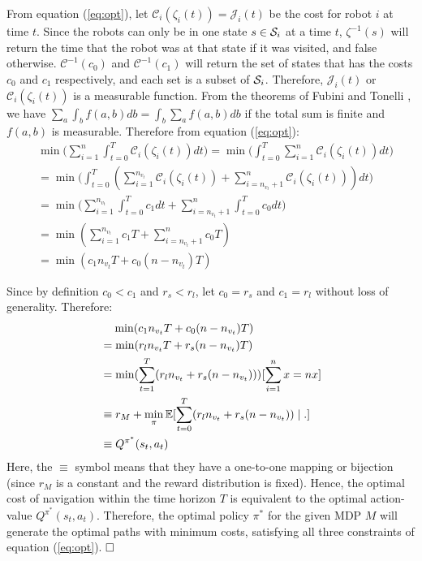 \documentclass[letterpaper, 10 pt, conference]{ieeeconf}  %
\begin{document}
From equation (\ref{eq:opt}), let $\mathcal{C}_i(\zeta_i(t)) = \mathcal{J}_i(t)$ be the cost for robot $i$ at time $t$. Since the robots can only be in one state $s \in \mathcal{S}_i$ at a time $t$, $\zeta^{-1}(s)$ will return the time that the robot was at that state if it was visited, and false otherwise. $\mathcal{C}^{-1}(c_0)$ and $\mathcal{C}^{-1}(c_1)$ will return the set of states that has the costs $c_0$ and $c_1$ respectively, and each set is a subset of $\mathcal{S}_i$. Therefore, $\mathcal{J}_i(t)$ or $\mathcal{C}_i(\zeta_i(t))$ is a measurable function. From the theorems of Fubini and Tonelli \cite{Royden2010RealAnalysis}, we have $\sum_a \int_b f(a,b)db = \int_b \sum_a f(a,b)db $ if the total sum is finite and $f(a,b)$ is measurable. Therefore from equation (\ref{eq:opt}):
\begin{align}
& \min \bigg( \sum_{i=1}^{n} \int_{t=0}^{T} \mathcal{C}_i (\zeta_i(t))dt \bigg) \nonumber = \min \bigg( \int_{t=0}^{T}  \sum_{i=1}^{n} \mathcal{C}_i (\zeta_i(t))dt \bigg) \nonumber \\
&=  \min \bigg( \int_{t=0}^{T} (\sum_{i=1}^{n_{v_t}} \mathcal{C}_i (\zeta_i(t)) + \sum_{i=n_{v_t}+1}^{n} \mathcal{C}_i (\zeta_i(t))) dt \bigg) \nonumber \\
&=  \min \bigg( \sum_{i=1}^{n_{v_t}} \int_{t=0}^{T} c_1dt + \sum_{i=n_{v_t}+1}^{n} \int_{t=0}^{T} c_0dt \bigg) \nonumber \\
&=  \min (\sum_{i=1}^{n_{v_t}} c_1 T+ \sum_{i=n_{v_t}+1}^{n} c_0 T) \nonumber \\
&=  \min (c_1n_{v_t}T + c_0(n-n_{v_t})T) 
\end{align}

Since by definition $c_0 < c_1$ and $r_s < r_l$, let $ c_0 = r_s$ and $c_1 = r_l$ without loss of generality. Therefore:
\begin{align}
&\phantom{=\ } \min (c_1n_{v_t}T + c_0(n-n_{v_t})T) \nonumber \\
&= \min (r_ln_{v_t} T+ r_s(n-n_{v_t}) T) \nonumber \\
&= \min (\sum_{t=1}^T(r_ln_{v_t} + r_s(n-n_{v_t}))) & \mathllap{[\sum_{i=1}^n x = nx]} \nonumber \\
&\equiv  r_M + \min_{\pi} \mathbb{E} [  \sum_{t=0}^T(r_l n_{v_t} +  r_s (n - n_{v_t})) \mid . ] \nonumber \\
&\equiv Q^{\pi^*}(s_t,a_t) 
\end{align}
Here, the $\equiv$ symbol means that they have a one-to-one mapping or bijection (since $r_M$ is a constant and the reward distribution is fixed). Hence, the optimal cost of navigation within the time horizon $T$ is equivalent to the optimal action-value $Q^{\pi^*}(s_t,a_t)$. Therefore, the optimal policy $\pi^*$ for the given MDP $M$ will generate the optimal paths with minimum costs, satisfying all three constraints of equation (\ref{eq:opt}). $\qed$
\end{document}
